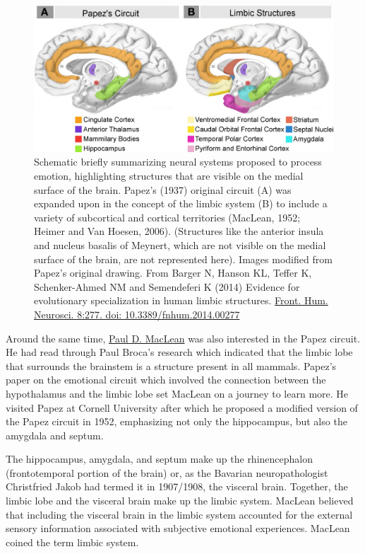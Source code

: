 \begin{figure}

{\centering \includegraphics[width=0.7\linewidth]{./figures/cns/papez_circuit} 

}

\caption{Schematic briefly summarizing neural systems proposed to process emotion, highlighting structures that are visible on the medial surface of the brain. Papez's (1937) original circuit (A) was expanded upon in the concept of the limbic system (B) to include a variety of subcortical and cortical territories (MacLean, 1952; Heimer and Van Hoesen, 2006). (Structures like the anterior insula and nucleus basalis of Meynert, which are not visible on the medial surface of the brain, are not represented here). Images modified from Papez's original drawing. From Barger N, Hanson KL, Teffer K, Schenker-Ahmed NM and Semendeferi K (2014) Evidence for evolutionary specialization in human limbic structures. \href{http://journal.frontiersin.org/article/10.3389/fnhum.2014.00277/full}{Front. Hum. Neurosci. 8:277. doi: 10.3389/fnhum.2014.00277}}\label{fig:papezcircuit}
\end{figure}

Around the same time, \href{https://en.wikipedia.org/wiki/Paul_D._MacLean}{Paul D. MacLean} was also interested in the Papez circuit. He had read through Paul Broca's research which indicated that the limbic lobe that surrounds the brainstem is a structure present in all mammals. Papez's paper on the emotional circuit which involved the connection between the hypothalamus and the limbic lobe set MacLean on a journey to learn more. He visited Papez at Cornell University after which he proposed a modified version of the Papez circuit in 1952, emphasizing not only the hippocampus, but also the amygdala and septum.

The hippocampus, amygdala, and septum make up the rhinencephalon (frontotemporal portion of the brain) or, as the Bavarian neuropathologist Christfried Jakob had termed it in 1907/1908, the visceral brain. Together, the limbic lobe and the visceral brain make up the limbic system. MacLean believed that including the visceral brain in the limbic system accounted for the external sensory information associated with subjective emotional experiences. MacLean coined the term limbic system.


